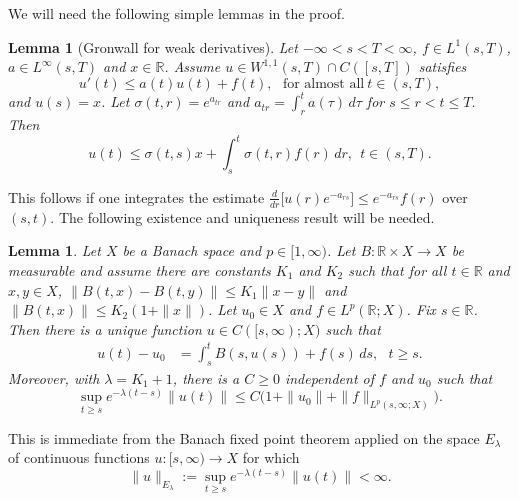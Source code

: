 \documentclass{amsart}
\theoremstyle{plain}
\theoremstyle{remark}
\theoremstyle{plain}
\newtheorem{lemma}[theorem]{Lemma}
\numberwithin{equation}{section}
\begin{document}
We will need the following simple lemmas in the proof.
\begin{lemma}[Gronwall for weak derivatives]\label{lem:Gron}
Let $-\infty<s<T<\infty$, $f\in L^1(s,T)$, $a\in L^\infty(s,T)$ and $x\in { \mathbb{R} }$. Assume $u\in W^{1,1}(s,T)\cap C([s,T])$ satisfies
\[u'(t) \leq a(t) u(t) + f(t), \ \ \ \text{for almost all} \ t\in (s,T),\]
and $u(s) = x$. Let $\sigma(t,r) = e^{a_{tr}}$ and $a_{tr}= \int_r^t a(\tau) \, d\tau$ for $s\leq r<t\leq T$. Then
\[u(t)\leq \sigma(t,s) x + \int_s^t \sigma(t,r) f(r) \, dr, \ \ t\in (s,T).\]
\end{lemma}
This follows if one integrates the estimate
$\frac{d}{dr}\big[u(r) e^{-a_{rs}}\big] \leq e^{-a_{rs}} f(r)$ over $(s,t)$.
The following existence and uniqueness result will be needed.

\begin{lemma}\label{lem:fixedpointW1}
Let $X$ be a Banach space and $p\in [1, \infty)$. Let $B:{ \mathbb{R} }\times X\to X$ be measurable and assume there are constants $K_1$ and $K_2$ such that for all $t\in { \mathbb{R} }$ and $x,y\in X$, $\|B(t,x) - B(t,y)\|\leq K_1\|x-y\|$ and $\|B(t,x)\|\leq K_2(1+\|x\|)$. Let $u_0\in X$ and $f\in L^p({ \mathbb{R} };X)$. Fix $s\in { \mathbb{R} }$. Then there is a unique function $u\in C([s,\infty);X)$ such that
\begin{align*}
u(t) - u_0 &= \int_s^t B(s,u(s)) + f(s)\, ds, \ \ \ t\geq s.
\end{align*}
Moreover, with $\lambda = K_1+1$, there is a $C\geq 0$ independent of $f$ and $u_0$ such that
\[ \sup_{t\geq s} e^{-\lambda (t-s)}\|u(t)\| \leq  C\big(1+\|u_0\|+\|f\|_{L^p(s,\infty;X)}\big).\]
\end{lemma}
This is immediate from the Banach fixed point theorem applied on the space
$E_{\lambda}$ of continuous functions $u:[s, \infty)\to X$ for which
\[\|u\|_{E_{\lambda}} := \sup_{t\geq s} e^{-\lambda(t-s)} \|u(t)\| <\infty.\]
\end{document}
